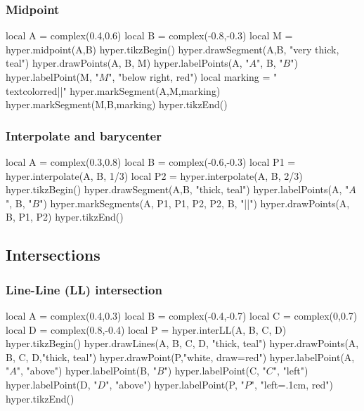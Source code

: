 \documentclass{article}
\begin{document}
\subsubsection{Midpoint}
\begin{codeandresult}
\begin{luacode*}
local A = complex(0.4,0.6)
local B = complex(-0.8,-0.3)
local M = hyper.midpoint(A,B)
hyper.tikzBegin()
hyper.drawSegment(A,B, "very thick, teal")
hyper.drawPoints(A, B, M)
hyper.labelPoints(A, "$A$", B, "$B$")
hyper.labelPoint(M, "$M$", "below right, red")
local marking = "\\textcolor{red}{||}"
hyper.markSegment(A,M,marking)
hyper.markSegment(M,B,marking)
hyper.tikzEnd()
\end{luacode*}
\end{codeandresult}

\subsubsection{Interpolate and barycenter}
\begin{codeandresult}
\begin{luacode*}
local A = complex(0.3,0.8)
local B = complex(-0.6,-0.3)
local P1 = hyper.interpolate(A, B, 1/3)
local P2 = hyper.interpolate(A, B, 2/3)
hyper.tikzBegin()
hyper.drawSegment(A,B, "thick, teal")
hyper.labelPoints(A, "$A$", B, "$B$")
hyper.markSegments(A, P1, P1, P2, P2, B, "||")
hyper.drawPoints(A, B, P1, P2)
hyper.tikzEnd()
\end{luacode*}
\end{codeandresult}

\subsection{Intersections}

\subsubsection{Line-Line (LL) intersection}
\begin{codeandresult}
\begin{luacode*}
local A = complex(0.4,0.3)
local B = complex(-0.4,-0.7)
local C = complex(0,0.7)
local D = complex(0.8,-0.4)
local P = hyper.interLL(A, B, C, D)
hyper.tikzBegin()
hyper.drawLines(A, B, C, D, "thick, teal")
hyper.drawPoints(A, B, C, D,"thick, teal")
hyper.drawPoint(P,"white, draw=red")
hyper.labelPoint(A, "$A$", "above")
hyper.labelPoint(B, "$B$")
hyper.labelPoint(C, "$C$", "left")
hyper.labelPoint(D, "$D$", "above")
hyper.labelPoint(P, "$P$", "left=.1cm, red")
hyper.tikzEnd()
\end{luacode*}
\end{codeandresult}
\end{document}

